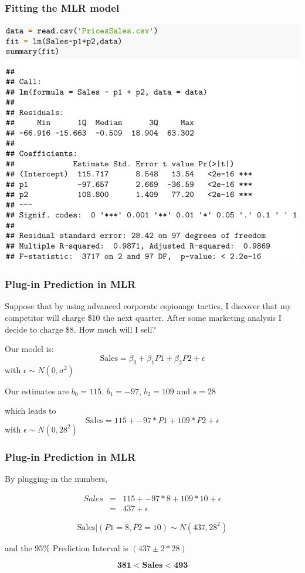 \documentclass{beamer}
\newcommand{\sk}{\vspace{.5cm}}
\begin{document}
\begin{frame}
	\frametitle{Fitting the MLR model}

	\begin{center}
	\includegraphics[scale=0.30]{figures/salesMLR1}		
	\end{center}

	
		
\end{frame}


\begin{frame}
\frametitle{Plug-in Prediction in MLR}  

Suppose that by using advanced corporate espionage tactics, I discover that my competitor will charge \$10 the next quarter. After some marketing analysis I decide to charge \$8. {\color{burntorange}How much will I sell?}

\vspace{-3mm}
\sk
Our model is: 
$$
\text{Sales} = \beta_0 + \beta_1 P1 + \beta_2 P2 + \epsilon
$$
with $\epsilon\sim N(0,\sigma^2)$\sk

Our estimates are $b_0 = 115$, $b_1=-97$, $b_2=109$ and $s=28$ 

which leads to
$$
\text{Sales} =115 + -97*P1 + 109*P2 + \epsilon 
$$
with $\epsilon \sim N(0,28^2)$

\end{frame}

\begin{frame}
\frametitle{Plug-in Prediction in MLR}  

By plugging-in the numbers,

\vspace{-3mm}
\begin{eqnarray*}
Sales &=&115 + -97*8 + 109*10 + \epsilon \\
&=& 437 + \epsilon
\end{eqnarray*}

$$
\text{Sales}|(P1 = 8, P2=10) \sim N(437,28^2)
$$

and the $95\%$ Prediction Interval is $(437 \pm 2 * 28)$

{\color{burntorange}
$$\mathbf{
381 < \text{Sales} < 493}
$$
}
\end{frame}
\end{document}
